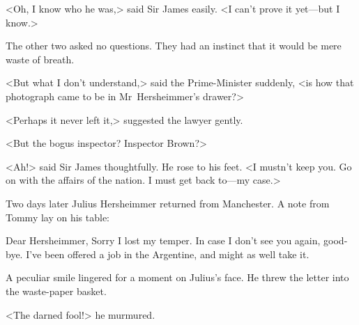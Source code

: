 <Oh, I know who he was,> said Sir James easily. <I can't prove it yet—but I know.>

The other two asked no questions. They had an instinct that it would be mere waste of breath.

<But what I don't understand,> said the Prime-Minister suddenly, <is how that photograph came to be in Mr~Hersheimmer's drawer?>

<Perhaps it never left it,> suggested the lawyer gently.

<But the bogus inspector? Inspector Brown?>

<Ah!> said Sir James thoughtfully. He rose to his feet. <I mustn't keep you. Go on with the affairs of the nation. I must get back to—my case.>

Two days later Julius Hersheimmer returned from Manchester. A note from Tommy lay on his table:

\begin{letter}
	\vspace{-1.5em}
\end{letter}
\begin{mail}{}{Dear Hersheimmer,}
Sorry I lost my temper. In case I don't see you again, good-bye. I've been offered a job in the Argentine, and might as well take it.
\end{mail}

A peculiar smile lingered for a moment on Julius's face. He threw the letter into the waste-paper basket.

<The darned fool!> he murmured. 